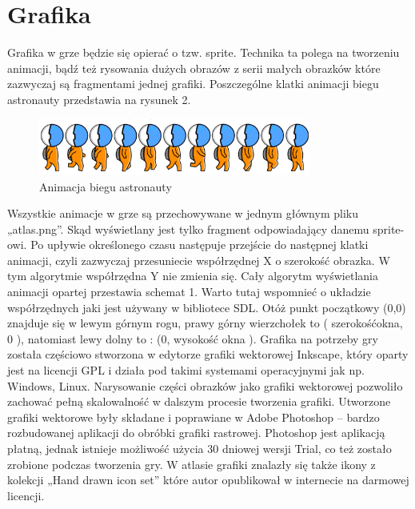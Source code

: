 \section{Grafika}

Grafika w grze będzie się opierać o tzw. sprite. Technika ta polega na tworzeniu animacji, bądź też rysowania dużych obrazów z serii małych obrazków
które zazwyczaj są fragmentami jednej grafiki. Poszczególne klatki animacji biegu astronauty przedstawia na rysunek 2.

\begin{figure}[h]
    \centering
    \includegraphics[width=0.8\textwidth,natwidth=410,natheight=142]{./Pictures/astroRun.jpg}
    \caption{Animacja biegu astronauty}
\end{figure}

Wszystkie animacje w grze są przechowywane w jednym głównym pliku „atlas.png”. Skąd wyświetlany jest tylko fragment odpowiadający danemu sprite-owi.
Po upływie określonego czasu następuje przejście do następnej klatki animacji, czyli zazwyczaj przesuniecie współrzędnej X o szerokość obrazka. W tym
algorytmie współrzędna Y nie zmienia się. Cały algorytm wyświetlania animacji opartej przestawia schemat 1.
Warto tutaj wspomnieć o układzie współrzędnych jaki jest używany w bibliotece SDL. Otóż punkt początkowy (0,0) znajduje się w lewym górnym
rogu, prawy górny wierzchołek to ( szerokośćokna, 0 ), natomiast lewy dolny to : (0, wysokość okna ). Grafika na potrzeby gry została częściowo
stworzona w edytorze grafiki wektorowej Inkscape, który oparty jest na licencji GPL i działa pod takimi systemami operacyjnymi jak np. Windows, Linux.
Narysowanie części obrazków jako grafiki wektorowej pozwoliło zachować pełną skalowalność w dalszym procesie tworzenia grafiki. Utworzone grafiki
wektorowe były składane i poprawiane w Adobe Photoshop – bardzo rozbudowanej aplikacji do obróbki grafiki rastrowej. Photoshop jest aplikacją płatną,
jednak istnieje możliwość użycia 30 dniowej wersji Trial, co też zostało zrobione podczas tworzenia gry. W atlasie grafiki znalazły się także ikony z
kolekcji „Hand drawn icon set” które autor opublikował w internecie  na darmowej licencji.

